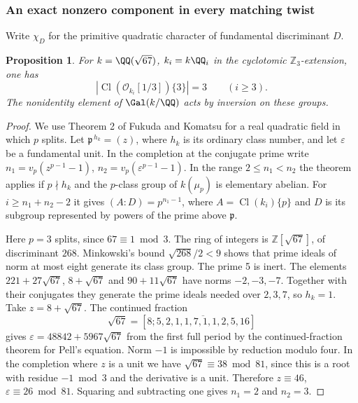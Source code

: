 \documentclass[a4paper,11pt]{article}
\newtheorem{proposition}{Proposition}[section]
\theoremstyle{definition}
\theoremstyle{remark}
\newcommand{\ZZ}{\mathbb Z}\newcommand{\ord}{\operatorname{ord}}
\numberwithin{equation}{section}
\newcommand{\Cl}{\operatorname{Cl}}
\begin{document}
\subsubsection{An exact nonzero component in every matching twist}\label{nav:III-25}
Write \(\chi_D\) for the primitive quadratic character of
fundamental discriminant \(D\).

\begin{proposition}\label{prop:67data191}
For \(k=\QQ(\sqrt{67})\), \(k_i=k\QQ_i\) in the cyclotomic
\(\ZZ_3\)-extension, one has
\[
           |\Cl(\mathcal O_{k_i}[1/3])\{3\}|=3
                  \qquad(i\ge3).
\]
The nonidentity element of \(\Gal(k/\QQ)\) acts by inversion
on these groups.
\end{proposition}
\begin{proof}
We use Theorem 2 of Fukuda and Komatsu for a real quadratic field
in which \(p\) splits. Let \(\mathfrak p^{\,h_k}=(z)\), where \(h_k\)
is its ordinary class number, and let \(\varepsilon\) be a fundamental
unit. In the completion at the conjugate prime write
\(n_1=v_p(z^{p-1}-1)\), \(n_2=v_p(\varepsilon^{p-1}-1)\).
In the range \(2\le n_1<n_2\) the theorem applies if
\(p\nmid h_k\) and the \(p\)-class group of \(k(\mu_p)\) is
elementary abelian. For \(i\ge n_1+n_2-2\) it gives
\((A:D)=p^{n_1-1}\), where \(A=\Cl(k_i)\{p\}\) and \(D\)
is its subgroup represented by powers of the prime above
\(\mathfrak p\).~\cite[Thm.~2, pp.~95--96]{V-III-V-fk191}

Here \(p=3\) splits, since \(67\equiv1\bmod3\).
The ring of integers is \(\ZZ[\sqrt{67}]\), of discriminant
\(268\). Minkowski's bound \(\sqrt{268}/2<9\) shows that
prime ideals of norm at most eight generate its class group.
The prime 5 is inert. The elements \(221+27\sqrt{67}\),
\(8+\sqrt{67}\) and \(90+11\sqrt{67}\) have norms
\(-2,-3,-7\). Together with their conjugates they generate the
prime ideals needed over \(2,3,7\), so \(h_k=1\). Take
\(z=8+\sqrt{67}\). The continued fraction
\[
 \sqrt{67}=[8;\overline{5,2,1,1,7,1,1,2,5,16}]
\]
gives \(\varepsilon=48842+5967\sqrt{67}\) from the first full
period by the continued-fraction theorem for Pell's equation.
Norm \(-1\) is impossible by reduction modulo four.
In the completion where \(z\) is a unit we have
\(\sqrt{67}\equiv38\bmod81\), since this is a root with residue
\(-1\bmod3\) and the derivative is a unit. Therefore
\(z\equiv46\), \(\varepsilon\equiv26\bmod81\).
Squaring and subtracting one gives \(n_1=2\) and \(n_2=3\).


\end{proof}
\end{document}
